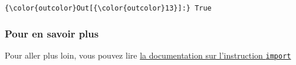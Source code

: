 \begin{Verbatim}[commandchars=\\\{\},frame=single,framerule=0.3mm,rulecolor=\color{cellframecolor}]
{\color{outcolor}Out[{\color{outcolor}13}]:} True
\end{Verbatim}
            
    \hypertarget{pour-en-savoir-plus}{%
\subsubsection{Pour en savoir plus}\label{pour-en-savoir-plus}}

    Pour aller plus loin, vous pouvez lire
\href{https://docs.python.org/3/reference/simple_stmts.html\#the-import-statement}{la
documentation sur l'instruction \texttt{import}}


    
    
    
